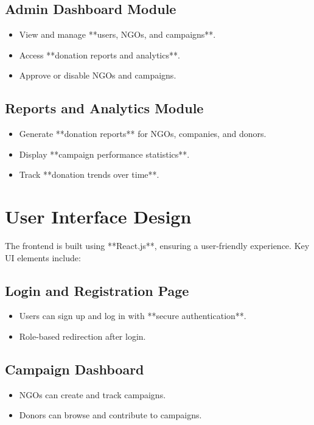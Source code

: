 \subsection{Admin Dashboard Module}
\begin{itemize}
    \item View and manage **users, NGOs, and campaigns**.
    \item Access **donation reports and analytics**.
    \item Approve or disable NGOs and campaigns.
\end{itemize}

\subsection{Reports and Analytics Module}
\begin{itemize}
    \item Generate **donation reports** for NGOs, companies, and donors.
    \item Display **campaign performance statistics**.
    \item Track **donation trends over time**.
\end{itemize}

\section{User Interface Design}
The frontend is built using **React.js**, ensuring a user-friendly experience. Key UI elements include:

\subsection{Login and Registration Page}
\begin{itemize}
    \item Users can sign up and log in with **secure authentication**.
    \item Role-based redirection after login.
\end{itemize}

\subsection{Campaign Dashboard}
\begin{itemize}
    \item NGOs can create and track campaigns.
    \item Donors can browse and contribute to campaigns.
\end{itemize}

